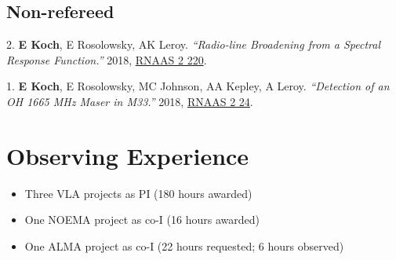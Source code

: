\documentclass[letterpaper,11pt]{article}
\newenvironment{publist}{
  \begingroup
  \raggedright
  \begin{description}[leftmargin=4ex,style=sameline]
}{
  \end{description}
  \endgroup
}
\begin{document}


\subsection*{Non-refereed}

\begin{publist}
\item[2.] \textbf{E Koch}, E Rosolowsky, AK Leroy. \textit{``Radio-line Broadening from a Spectral Response Function.''} 2018, \href{http://adsabs.harvard.edu/abs/2018RNAAS...2d.220K}{RNAAS 2 220}.
\item[1.] \textbf{E Koch}, E Rosolowsky, MC Johnson, AA Kepley, A Leroy. \textit{``Detection of an OH 1665 MHz Maser in M33.''} 2018, \href{http://adsabs.harvard.edu/abs/2018RNAAS...2a..24K}{RNAAS 2 24}.
\end{publist}


\section*{Observing Experience}
\begin{itemize}
\item Three VLA projects as PI (180 hours awarded)
\item One NOEMA project as co-I (16 hours awarded)
\item One ALMA project as co-I (22 hours requested; 6 hours observed)
\end{itemize}
\end{document}

